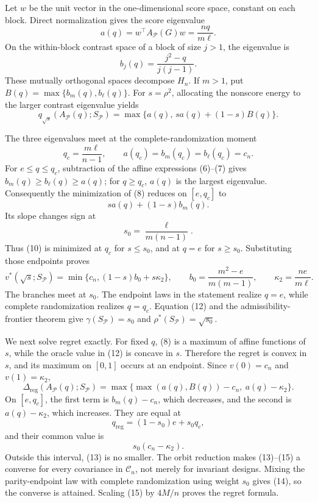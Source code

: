Let \(w\) be the unit vector in the one-dimensional score space, constant on each block.  Direct normalization gives the score eigenvalue
\[
a(q)=w^\top A_{\mathcal P}(G)w=\frac{nq}{m\ell}.
\tag{6}
\]
On the within-block contrast space of a block of size \(j>1\), the eigenvalue is
\[
b_j(q)=\frac{j^2-q}{j(j-1)}.
\tag{7}
\]
These mutually orthogonal spaces decompose \(H_n\).  If \(m>1\), put \(B(q)=\max\{b_m(q),b_\ell(q)\}\).  For \(s=\rho^2\), allocating the nonscore energy to the larger contrast eigenvalue yields
\[
q_{\sqrt{s}}(A_{\mathcal P}(q);S_{\mathcal P})
=\max\{a(q),\,sa(q)+(1-s)B(q)\}.
\tag{8}
\]

The three eigenvalues meet at the complete-randomization moment
\[
q_c=\frac{m\ell}{n-1},
\qquad
a(q_c)=b_m(q_c)=b_\ell(q_c)=c_n.
\tag{9}
\]
For \(e\leq q\leq q_c\), subtraction of the affine expressions (6)--(7) gives \(b_m(q)\geq b_\ell(q)\geq a(q)\); for \(q\geq q_c\), \(a(q)\) is the largest eigenvalue.  Consequently the minimization of (8) reduces on \([e,q_c]\) to
\[
sa(q)+(1-s)b_m(q).
\tag{10}
\]
Its slope changes sign at
\[
s_0=\frac{\ell}{m(n-1)}.
\tag{11}
\]
Thus (10) is minimized at \(q_c\) for \(s\leq s_0\), and at \(q=e\) for \(s\geq s_0\).  Substituting those endpoints proves
\[
v^*(\sqrt{s};S_{\mathcal P})
=\min\{c_n,(1-s)b_0+s\kappa_2\},
\qquad
b_0=\frac{m^2-e}{m(m-1)},
\qquad
\kappa_2=\frac{ne}{m\ell}.
\tag{12}
\]
The branches meet at \(s_0\).  The endpoint laws in the statement realize \(q=e\), while complete randomization realizes \(q=q_c\).  Equation (12) and the admissibility-frontier theorem give \(\gamma(S_{\mathcal P})=s_0\) and \(\rho^*(S_{\mathcal P})=\sqrt{s_0}\).

We next solve regret exactly.  For fixed \(q\), (8) is a maximum of affine functions of \(s\), while the oracle value in (12) is concave in \(s\).  Therefore the regret is convex in \(s\), and its maximum on \([0,1]\) occurs at an endpoint.  Since \(v(0)=c_n\) and \(v(1)=\kappa_2\),
\[
\Delta_{\mathrm{reg}}(A_{\mathcal P}(q);S_{\mathcal P})
=\max\{\max(a(q),B(q))-c_n,\ a(q)-\kappa_2\}.
\tag{13}
\]
On \([e,q_c]\), the first term is \(b_m(q)-c_n\), which decreases, and the second is \(a(q)-\kappa_2\), which increases.  They are equal at
\[
q_{\mathrm{reg}}=(1-s_0)e+s_0q_c,
\tag{14}
\]
and their common value is
\[
s_0(c_n-\kappa_2).
\tag{15}
\]
Outside this interval, (13) is no smaller.  The orbit reduction makes (13)--(15) a converse for every covariance in \(\mathcal C_n\), not merely for invariant designs.  Mixing the parity-endpoint law with complete randomization using weight \(s_0\) gives (14), so the converse is attained.  Scaling (15) by \(4M/n\) proves the regret formula.

